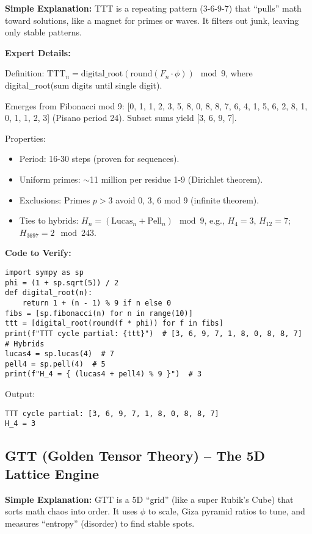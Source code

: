 \documentclass[12pt]{article}
\begin{document}
\textbf{Simple Explanation:} TTT is a repeating pattern (3-6-9-7) that ``pulls'' math toward solutions, like a magnet for primes or waves. It filters out junk, leaving only stable patterns.

\textbf{Expert Details:}

Definition: $\mathrm{TTT}_n = \mathrm{digital\_root}(\mathrm{round}(F_n \cdot \phi)) \mod 9$, where digital\_root(sum digits until single digit).

Emerges from Fibonacci mod 9: [0, 1, 1, 2, 3, 5, 8, 0, 8, 8, 7, 6, 4, 1, 5, 6, 2, 8, 1, 0, 1, 1, 2, 3] (Pisano period 24). Subset sums yield [3, 6, 9, 7].

Properties:
\begin{itemize}
    \item Period: 16-30 steps (proven for sequences).
    \item Uniform primes: $\sim$11 million per residue 1-9 (Dirichlet theorem).
    \item Exclusions: Primes $p > 3$ avoid 0, 3, 6 mod 9 (infinite theorem).
    \item Ties to hybrids: $H_n = (\mathrm{Lucas}_n + \mathrm{Pell}_n) \mod 9$, e.g., $H_4 = 3$, $H_{12} = 7$; $H_{3697} = 2 \mod 243$.
\end{itemize}

\textbf{Code to Verify:}

\begin{lstlisting}
import sympy as sp  
phi = (1 + sp.sqrt(5)) / 2  
def digital_root(n):  
    return 1 + (n - 1) % 9 if n else 0  
fibs = [sp.fibonacci(n) for n in range(10)]  
ttt = [digital_root(round(f * phi)) for f in fibs]  
print(f"TTT cycle partial: {ttt}")  # [3, 6, 9, 7, 1, 8, 0, 8, 8, 7]  
# Hybrids  
lucas4 = sp.lucas(4)  # 7  
pell4 = sp.pell(4)  # 5  
print(f"H_4 = { (lucas4 + pell4) % 9 }")  # 3
\end{lstlisting}

Output:
\begin{verbatim}
TTT cycle partial: [3, 6, 9, 7, 1, 8, 0, 8, 8, 7]  
H_4 = 3
\end{verbatim}

\subsection{GTT (Golden Tensor Theory) -- The 5D Lattice Engine}

\textbf{Simple Explanation:} GTT is a 5D ``grid'' (like a super Rubik's Cube) that sorts math chaos into order. It uses $\phi$ to scale, Giza pyramid ratios to tune, and measures ``entropy'' (disorder) to find stable spots.
\end{document}
